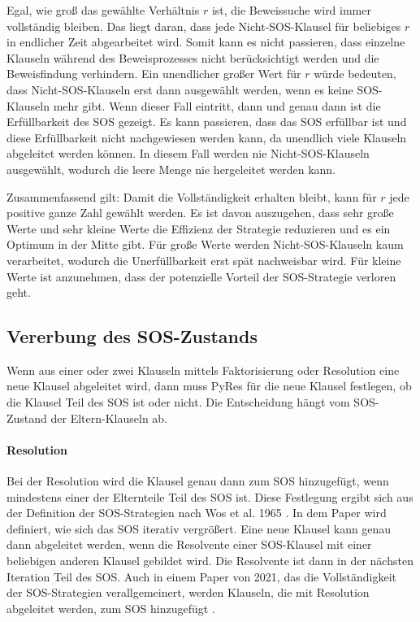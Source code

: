 Egal, wie groß das gewählte Verhältnis $r$ ist, die Beweissuche wird immer vollständig bleiben. Das liegt daran, dass jede Nicht-SOS-Klausel für beliebiges $r$ in endlicher Zeit abgearbeitet wird. Somit kann es nicht passieren, dass einzelne Klauseln während des Beweisprozesses nicht berücksichtigt werden und die Beweisfindung verhindern.
Ein unendlicher großer Wert für $r$ würde bedeuten, dass Nicht-SOS-Klauseln erst dann ausgewählt werden, wenn es keine SOS-Klauseln mehr gibt. Wenn dieser Fall eintritt, dann und genau dann ist die Erfüllbarkeit des SOS gezeigt. Es kann passieren, dass das SOS erfüllbar ist und diese Erfüllbarkeit nicht nachgewiesen werden kann, da unendlich viele Klauseln abgeleitet werden können. In diesem Fall werden nie Nicht-SOS-Klauseln ausgewählt, wodurch die leere Menge nie hergeleitet werden kann. 

Zusammenfassend gilt: Damit die Vollständigkeit erhalten bleibt, kann für $r$ jede positive ganze Zahl gewählt werden. Es ist davon auszugehen, dass sehr große Werte und sehr kleine Werte die Effizienz der Strategie reduzieren und es ein Optimum in der Mitte gibt. Für große Werte werden Nicht-SOS-Klauseln kaum verarbeitet, wodurch die Unerfüllbarkeit erst spät nachweisbar wird. Für kleine Werte ist anzunehmen, dass der potenzielle Vorteil der SOS-Strategie verloren geht.

\subsection{Vererbung des SOS-Zustands}

Wenn aus einer oder zwei Klauseln mittels Faktorisierung oder Resolution eine neue Klausel abgeleitet wird, dann muss PyRes für die neue Klausel festlegen, ob die Klausel Teil des SOS ist oder nicht. Die Entscheidung hängt vom SOS-Zustand der Eltern-Klauseln ab.
\paragraph{Resolution}
Bei der Resolution wird die Klausel genau dann zum SOS hinzugefügt, wenn mindestens einer der Elternteile Teil des SOS ist. Diese Festlegung ergibt sich aus der Definition der SOS-Strategien nach Wos et al. 1965 \cite{Wos1965Sos}. In dem Paper wird definiert, wie sich das SOS iterativ vergrößert. Eine neue Klausel kann genau dann abgeleitet werden, wenn die Resolvente einer SOS-Klausel mit einer beliebigen anderen Klausel gebildet wird. Die Resolvente ist dann in der nächsten Iteration Teil des SOS. Auch in einem Paper von 2021, das die Vollständigkeit der SOS-Strategien verallgemeinert, werden Klauseln, die mit Resolution abgeleitet werden, zum SOS hinzugefügt \cite{Haifani2021Sos}.

